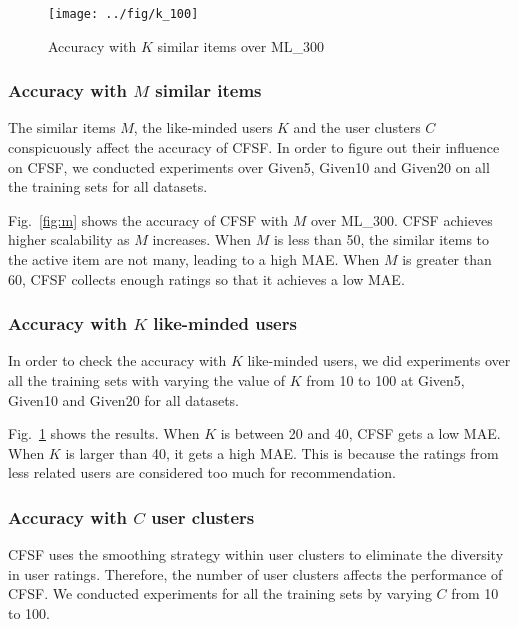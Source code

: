 



\begin{figure}[htb]
  \centering
  \texttt{[image: ../fig/k\_100]}\\
  \caption{Accuracy with $K$ similar items over ML\_300}
  \label{fig:k}
\end{figure}



\subsubsection{Accuracy with $M$ similar items}\label{sec:M}
The similar items $M$, the like-minded users $K$ and the user clusters $C$ conspicuously affect the accuracy of CFSF. In order to figure out their influence on CFSF, we conducted experiments over Given5, Given10 and Given20 on all the training sets for all datasets.

Fig.~\ref{fig:m} shows the accuracy of CFSF with $M$ over ML\_300. CFSF achieves higher scalability as $M$ increases. When $M$ is less than 50, the similar items to the active item are not many, leading to a high MAE. When $M$ is greater than 60, CFSF collects enough ratings so that it achieves a low MAE.

\subsubsection{Accuracy with $K$ like-minded users}\label{sec:K}
In order to check the accuracy with $K$ like-minded users, we did experiments over all the training sets with varying the value of $K$ from 10 to 100 at Given5, Given10 and Given20 for all datasets.

Fig.~\ref{fig:k} shows the results. When $K$ is between 20 and 40, CFSF gets a low MAE. When $K$ is larger than 40, it gets a high MAE. This is because the ratings from less related users are considered too much for recommendation.

\subsubsection{Accuracy with $C$ user clusters}\label{sec:c}
CFSF uses the smoothing strategy within user clusters to eliminate the diversity in user ratings. Therefore, the number of user clusters affects the performance of CFSF. We conducted experiments for all the training sets by varying $C$ from 10 to 100.

